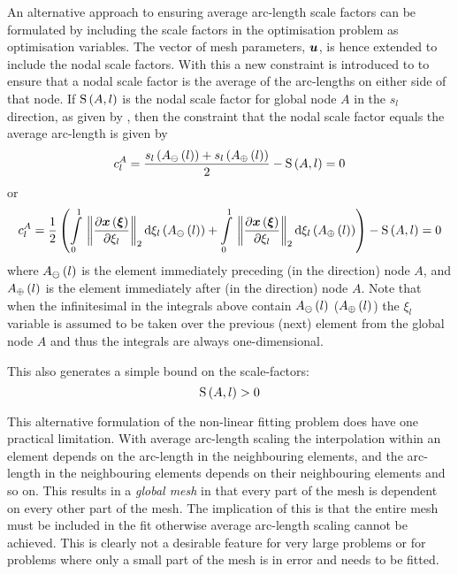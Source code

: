 An alternative approach to ensuring average arc-length scale factors can be
formulated by including the scale factors in the optimisation problem as
optimisation variables.  The vector of mesh parameters, $ \boldsymbol{u} $, is hence
extended to include the nodal scale factors. With this a new constraint is
introduced to  to ensure that a nodal scale factor is
the average of the arc-lengths on either side of that node. If $   \mathrm{S} \left( A,l \right)  $ is
the nodal scale factor for global node $A$ in the $s_{l}$ direction, as given
by , then the constraint that the nodal scale
factor equals the average arc-length is given by
\begin{equation}
  c^{A}_{l}=\dfrac{ s_{l}\left(  A_{\ominus}\left( l \right)  \right) +
     s_{l}\left(  A_{\oplus}\left( l \right)  \right) }{2}-   \mathrm{S} \left( A,l \right)  =0
\end{equation}
or
\begin{equation} 
  c^{A}_{l}=\dfrac{1}{2}\pbrac{
    \gint{0}{1}{\norm{\delby{\fnof{\vectr{x}}{\vectr{\xi}}}{\xi_{l}}}}{
      \fnof{\xi_{l}}{\fnof{A_{\ominus}}{l}}}+
    \gint{0}{1}{\norm{\delby{\fnof{\vectr{x}}{\vectr{\xi}}}{\xi_{l}}}}{
      \fnof{\xi_{l}}{\fnof{A_{\oplus}}{l}}}}-\gsf{A}{l}=0
  \label{eqn:avarclenconstraint}
\end{equation}
where $ A_{\ominus}\left( l \right) $ is the element immediately preceding (in the
 direction) node $A$, and $ A_{\oplus}\left( l \right) $ is the element
immediately after (in the  direction) node $A$. Note that when the
infinitesimal in the integrals above contain
$ A_{\ominus}\left( l \right) $ ($ A_{\oplus}\left( l \right) $) the $\xi_{l}$ variable is
assumed to be taken over the previous (next) element from the global node $A$
and thus the integrals are always one-dimensional.

This also generates a simple bound on the scale-factors:
\begin{equation}
     \mathrm{S} \left( A,l \right)   > 0
\end{equation}

This alternative formulation of the non-linear fitting problem does have one
practical limitation. With average arc-length scaling the interpolation within an
element depends on the arc-length in the neighbouring elements, and the arc-length
in the neighbouring elements depends on their neighbouring elements and so on.
This results in a \emph{global mesh} in that every part of the mesh is
dependent on every other part of the mesh. The implication of this is that the
entire mesh must be included in the fit otherwise average arc-length scaling
cannot be achieved. This is clearly not a desirable feature for very large
problems or for problems where only a small part of the mesh is in error and
needs to be fitted. 


